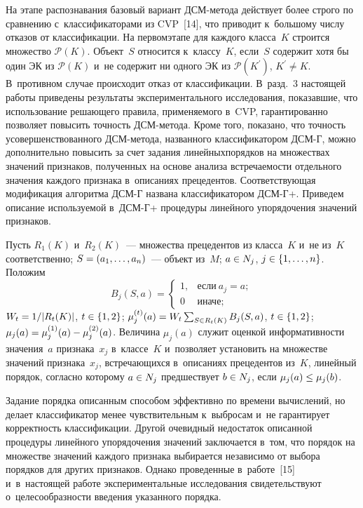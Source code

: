 \begin{multicols}{2}
  На этапе распознавания базовый вариант ДСМ-ме\-то\-да действует более 
строго по сравнению с~классификаторами из CVP~[14], что приводит 
к~большому числу отказов от классификации. На первом\linebreak этапе для каждого 
класса~$K$ строится множество $\mathcal{P}(K)$. Объект~$S$ относится 
к~классу~$K$, если~$S$ содержит хотя бы один ЭК из $\mathcal{P}(K)$ и~не 
содержит ни одного ЭК из $\mathcal{P}(K^\prime)$, $K^\prime\not= K$. 
В~противном случае происходит отказ от классификации. В~разд.~3 настоящей 
работы приведены результаты экспериментального исследования, показавшие, 
что использование решающего правила, применяемого в~CVP, гарантированно 
позволяет повысить точность ДСМ-ме\-то\-да. Кроме того, показано, что\linebreak 
точ\-ность усовершенствованного ДСМ-ме\-то\-да, названного классификатором 
\mbox{ДСМ-Г}, мож\-но дополнительно повысить за счет задания \mbox{линейных}\linebreak порядков на 
множествах значений признаков, полученных на основе анализа встре\-ча\-емости 
отдельного значения каждого признака в~описаниях \mbox{прецедентов}. 
Со\-от\-вет\-ст\-ву\-ющая \mbox{модификация} алгоритма \mbox{ДСМ-Г} названа классификатором 
\mbox{ДСМ-Г+}. Приведем описание используемой в~\mbox{ДСМ-Г+} процедуры линейного 
упорядочения значений при\-зна\-ков. 
{ %

}
  
  Пусть $R_1(K)$ и~$R_2(K)$~--- множества прецедентов из класса~$K$ и~не 
из~$K$ соответственно; $S\hm= (a_1,\ldots , a_n)$~--- объект из~$M$; $a\hm\in 
N_j$, $j\hm\in \{1, \ldots,n\}$. Положим 
$$
B_j(S,a)=
\begin{cases}
1, &\mbox{если}\  a_j=a;\\
0 &\mbox{иначе};
\end{cases}
$$
 $W_t\hm= 1/\vert R_t(K)\vert$, $t\hm\in \{1,2\}$; 
$\mu_j^{(t)}(a)\hm= W_t\sum\nolimits_{S\in R_t(K)} B_j(S,a)$, $t\hm\in \{1,2\}$; 
$\mu_j(a)\hm= \mu_j^{(1)}(a)\hm- \mu_j^{(2)}(a)$. Величина $\mu_j(a)$ служит 
оценкой информативности значения~$a$ признака~$x_j$ в~классе~$K$\linebreak 
и~позволяет установить на множестве значений признака~$x_j$, 
встречающихся в~описаниях прецедентов из~$K$, линейный порядок, согласно 
которому $a\hm\in N_j$ предшествует $b\hm\in N_j$, если $\mu_j(a)\hm\leq 
\mu_j(b)$.
  
  Задание порядка описанным способом эффективно по времени вычислений, 
но делает классификатор менее чувствительным к~выбросам и~не гарантирует 
корректность классификации. Другой очевидный недостаток описанной 
процедуры линейного упорядочения значений заключается в~том, что порядок 
на множестве значений каждого признака выбирается независимо от выбора 
порядков для других признаков. Однако проведенные в~работе~[15] 
и~в~настоящей работе экспериментальные исследования свидетельствуют 
о~целесообразности введения указанного порядка.


\end{multicols}
